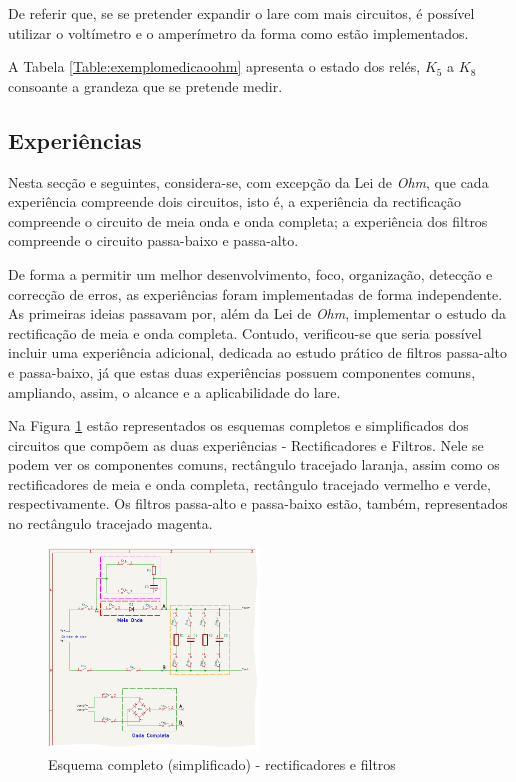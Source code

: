 De referir que, se se pretender expandir o \acrshort{lare} com mais circuitos, é possível utilizar o voltímetro e o amperímetro da forma como estão implementados. 

A Tabela \ref{Table:exemplomedicaoohm} apresenta o estado dos relés, $K_{5}$ a $K_{8}$ consoante a grandeza que se pretende medir.

\subsection{Experiências}
\label{sec:experiencias}
Nesta secção e seguintes, considera-se, com excepção da Lei de \textit{Ohm}, que cada experiência compreende dois circuitos, isto é, a experiência da rectificação compreende o circuito de meia onda e onda completa; a experiência dos filtros compreende o circuito passa-baixo e passa-alto.

De forma a permitir um melhor desenvolvimento, foco, organização, detecção e correcção de erros, as experiências foram implementadas de forma independente. As primeiras ideias passavam por, além da Lei de \textit{Ohm}, implementar o estudo da rectificação de meia e onda completa. Contudo, verificou-se que seria possível incluir uma experiência adicional, dedicada ao estudo prático de filtros passa-alto e passa-baixo, já que estas duas experiências possuem componentes comuns, ampliando, assim, o alcance e a aplicabilidade do \acrshort{lare}.

Na Figura \ref{fig:rectificacao_filtragem_full} estão representados os esquemas completos e simplificados dos circuitos que compõem as duas experiências - Rectificadores e Filtros. Nele se podem ver os componentes comuns, rectângulo tracejado laranja, assim como os rectificadores de meia e onda completa, rectângulo tracejado vermelho e verde, respectivamente. Os filtros passa-alto e passa-baixo estão, também, representados no rectângulo tracejado magenta.

\begin{figure}[hbtp]
	\centering
	\includegraphics[width=0.5\textwidth]{figures/rec_fil_FULL.png}
	\caption{Esquema completo (simplificado) - rectificadores e filtros}
	\label{fig:rectificacao_filtragem_full}
\end{figure}

